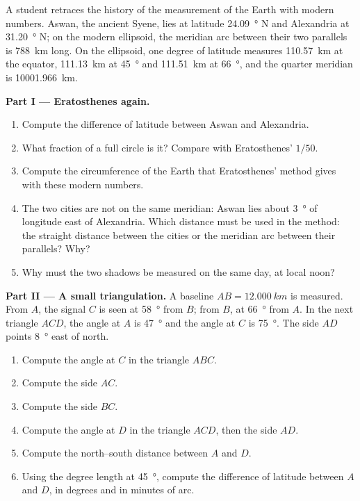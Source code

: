 \begin{problem}
\label{pb:g10:measuring-the-earth:1}
A student retraces the history of the measurement of the Earth with modern
numbers. Aswan, the ancient Syene, lies at latitude
\qty{24.09}{\degree} N and Alexandria at \qty{31.20}{\degree} N; on the
modern ellipsoid, the meridian arc between their two parallels is
\qty{788}{km} long. On the ellipsoid, one degree of latitude measures
\qty{110.57}{km} at the equator, \qty{111.13}{km} at \qty{45}{\degree} and
\qty{111.51}{km} at \qty{66}{\degree}, and the quarter meridian is
\qty{10001.966}{km}.

\medskip
\noindent\textbf{Part I --- Eratosthenes again.}
\begin{enumerate}
  \item Compute the difference of latitude between Aswan and Alexandria.
  \item What fraction of a full circle is it? Compare with Eratosthenes'
        $1/50$.
  \item Compute the circumference of the Earth that Eratosthenes' method
        gives with these modern numbers.
  \item The two cities are not on the same meridian: Aswan lies about
        \qty{3}{\degree} of longitude east of Alexandria. Which distance must
        be used in the method: the straight distance between the cities or
        the meridian arc between their parallels? Why?
  \item Why must the two shadows be measured on the same day, at local noon?
\end{enumerate}

\medskip
\noindent\textbf{Part II --- A small triangulation.}
A baseline $AB = \qty{12.000}{km}$ is measured. From $A$, the signal $C$ is
seen at \qty{58}{\degree} from $B$; from $B$, at \qty{66}{\degree} from $A$.
In the next triangle $ACD$, the angle at $A$ is \qty{47}{\degree} and the
angle at $C$ is \qty{75}{\degree}. The side $AD$ points \qty{8}{\degree}
east of north.
\begin{enumerate}[resume]
  \item Compute the angle at $C$ in the triangle $ABC$.
  \item Compute the side $AC$.
  \item Compute the side $BC$.
  \item Compute the angle at $D$ in the triangle $ACD$, then the side $AD$.
  \item Compute the north--south distance between $A$ and $D$.
  \item Using the degree length at \qty{45}{\degree}, compute the
        difference of latitude between $A$ and $D$, in degrees and in
        minutes of arc.
\end{enumerate}


\end{problem}
